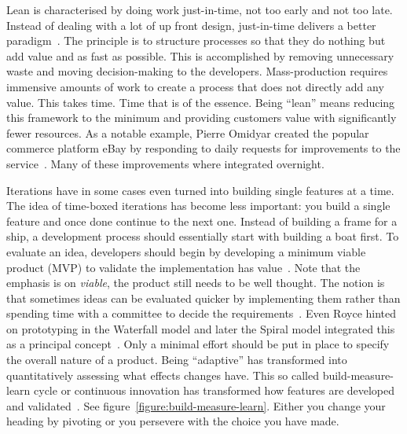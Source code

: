 \documentclass[english]{tktltiki2}
\begin{document}
Lean is characterised by doing work just-in-time, not too early and not too late. Instead of dealing with a lot of up front design, just-in-time delivers a better paradigm~\cite{Pop02}. The principle is to structure processes so that they do nothing but add value and as fast as possible. This is accomplished by removing unnecessary waste and moving decision-making to the developers. Mass-production requires immensive amounts of work to create a process that does not directly add any value. This takes time. Time that is of the essence. Being “lean” means reducing this framework to the minimum and providing customers value with significantly fewer resources. As a notable example, Pierre Omidyar created the popular commerce platform eBay by responding to daily requests for improvements to the service~\cite{Pop02}. Many of these improvements where integrated overnight.

Iterations have in some cases even turned into building single features at a time. The idea of time-boxed iterations has become less important: you build a single feature and once done continue to the next one. Instead of building a frame for a ship, a development process should essentially start with building a boat first. To evaluate an idea, developers should begin by developing a minimum viable product (MVP) to validate the implementation has value~\cite{Rie11}. Note that the emphasis is on \emph{viable}, the product still needs to be well thought. The notion is that sometimes ideas can be evaluated quicker by implementing them rather than spending time with a committee to decide the requirements~\cite{Pop02}. Even Royce hinted on prototyping in the Waterfall model and later the Spiral model integrated this as a principal concept~\cite{Roy70, Boe88}. Only a minimal effort should be put in place to specify the overall nature of a product. Being “adaptive” has transformed into quantitatively assessing what effects changes have. This so called build-measure-learn cycle or continuous innovation has transformed how features are developed and validated~\cite{Rie11}. See figure~\ref{figure:build-measure-learn}. Either you change your heading by pivoting or you persevere with the choice you have made.
\end{document}
